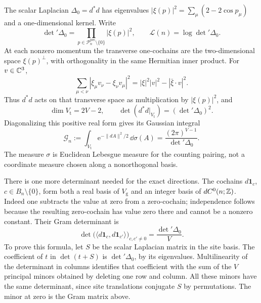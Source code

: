 The scalar Laplacian $\Delta_0=d^*d$ has eigenvalues
$|\xi(p)|^2=\sum_\mu(2-2\cos p_\mu)$ and a one-dimensional
kernel. Write
\begin{equation}\label{eq:external-scalar-determinant}
 \det{}'\Delta_0=\prod_{p\in\mathcal P_n^{\mathrm{per}}\setminus\{0\}}
                       |\xi(p)|^2,\qquad
 \mathcal L(n)=\log\det{}'\Delta_0.
\end{equation}
At each nonzero momentum the transverse one-cochains
are the two-dimensional space $\xi(p)^\perp$, with orthogonality
in the same Hermitian inner product. For $v\in\mathbb C^3$,
\[
 \sum_{\mu<\nu}|\xi_\mu v_\nu-\xi_\nu v_\mu|^2
           =|\xi|^2|v|^2-|\bar\xi\cdot v|^2.
\]
Thus $d^*d$ acts on that transverse space as multiplication
by $|\xi(p)|^2$, and
\begin{equation}\label{eq:external-transverse-determinant}
 \dim V_{\mathrm t}=2V-2,\qquad
 \det(d^*d|_{V_{\mathrm t}})=(\det{}'\Delta_0)^2.
\end{equation}
Diagonalizing this positive real form gives its Gaussian integral
\begin{equation}\label{eq:external-transverse-Gaussian}
 \mathcal G_n:=\int_{V_{\mathrm t}}\mathrm e^{-\|dA\|^2/2}\,\dd\sigma(A)
                    =\frac{(2\pi)^{V-1}}{\det{}'\Delta_0}.
\end{equation}
The measure $\sigma$ is Euclidean Lebesgue measure for the
counting pairing, not a coordinate measure chosen along a
nonorthogonal basis.

There is one more determinant needed for the exact directions.
The cochains $d\mathbf1_c$, $c\in B_n\setminus\{0\}$,
form both a real basis of $V_{\mathrm g}$ and an integer
basis of $dC^0(n;\mathbb Z)$. Indeed one subtracts the value at
zero from a zero-cochain; independence follows because
the resulting zero-cochain has value zero there and
cannot be a nonzero constant. Their Gram determinant is
\begin{equation}\label{eq:external-exact-Gram}
 \det\big(\langle d\mathbf1_c,d\mathbf1_{c'}\rangle\big)_{c,c'\ne0}
                           =\frac{\det{}'\Delta_0}{V}.
\end{equation}
To prove this formula, let $S$ be the scalar Laplacian matrix
in the site basis. The coefficient of $t$ in $\det(t+S)$
is $\det{}'\Delta_0$, by its eigenvalues. Multilinearity
of the determinant in columns identifies that coefficient
with the sum of the $V$ principal minors obtained by
deleting one row and column. All these minors have the same
determinant, since site translations conjugate $S$ by
permutations. The minor at zero is the Gram matrix above.

